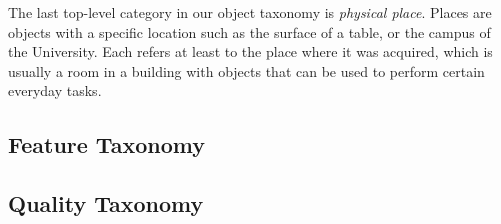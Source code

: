 The last top-level category in our object taxonomy is \emph{physical place}.
Places are objects with a specific location such as the surface of a table, or the campus of the University.
Each \neem refers at least to the place where it was acquired, which is usually a room in a building with objects that can be used to perform certain everyday tasks.




\subsection{Feature Taxonomy}

\subsection{Quality Taxonomy}
 

